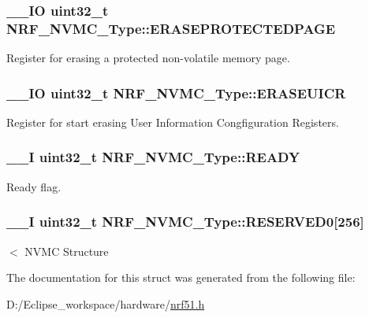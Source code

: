 \subsubsection[{E\+R\+A\+S\+E\+P\+R\+O\+T\+E\+C\+T\+E\+D\+P\+A\+G\+E}]{\setlength{\rightskip}{0pt plus 5cm}\+\_\+\+\_\+\+I\+O uint32\+\_\+t N\+R\+F\+\_\+\+N\+V\+M\+C\+\_\+\+Type\+::\+E\+R\+A\+S\+E\+P\+R\+O\+T\+E\+C\+T\+E\+D\+P\+A\+G\+E}\label{struct_n_r_f___n_v_m_c___type_aba164fc724a0350325ac6234b18660e4}
Register for erasing a protected non-\/volatile memory page. \hypertarget{struct_n_r_f___n_v_m_c___type_ac30e5500fbf650ccfd3378c4d59a0bc5}{}
\subsubsection[{E\+R\+A\+S\+E\+U\+I\+C\+R}]{\setlength{\rightskip}{0pt plus 5cm}\+\_\+\+\_\+\+I\+O uint32\+\_\+t N\+R\+F\+\_\+\+N\+V\+M\+C\+\_\+\+Type\+::\+E\+R\+A\+S\+E\+U\+I\+C\+R}\label{struct_n_r_f___n_v_m_c___type_ac30e5500fbf650ccfd3378c4d59a0bc5}
Register for start erasing User Information Congfiguration Registers. \hypertarget{struct_n_r_f___n_v_m_c___type_a4bcb016f1e674c99a00d6cd406338f00}{}
\subsubsection[{R\+E\+A\+D\+Y}]{\setlength{\rightskip}{0pt plus 5cm}\+\_\+\+\_\+\+I uint32\+\_\+t N\+R\+F\+\_\+\+N\+V\+M\+C\+\_\+\+Type\+::\+R\+E\+A\+D\+Y}\label{struct_n_r_f___n_v_m_c___type_a4bcb016f1e674c99a00d6cd406338f00}
Ready flag. \hypertarget{struct_n_r_f___n_v_m_c___type_a61687977279bb28a1ec77b69d090d343}{}
\subsubsection[{R\+E\+S\+E\+R\+V\+E\+D0}]{\setlength{\rightskip}{0pt plus 5cm}\+\_\+\+\_\+\+I uint32\+\_\+t N\+R\+F\+\_\+\+N\+V\+M\+C\+\_\+\+Type\+::\+R\+E\+S\+E\+R\+V\+E\+D0\mbox{[}256\mbox{]}}\label{struct_n_r_f___n_v_m_c___type_a61687977279bb28a1ec77b69d090d343}
$<$ N\+V\+M\+C Structure 

The documentation for this struct was generated from the following file\+:\begin{DoxyCompactItemize}
\item 
D\+:/\+Eclipse\+\_\+workspace/hardware/\hyperlink{nrf51_8h}{nrf51.\+h}\end{DoxyCompactItemize}
